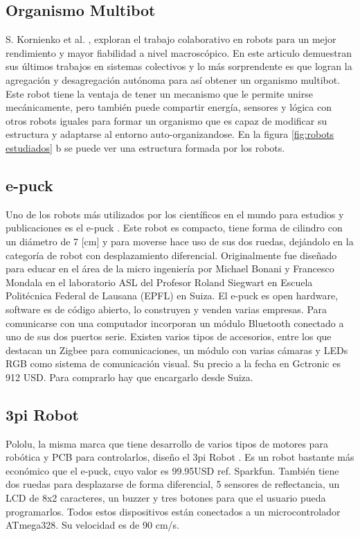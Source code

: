 \subsection{Organismo Multibot}
S. Kornienko et al. \cite{5359578}, exploran el trabajo colaborativo en robots para un mejor rendimiento y mayor fiabilidad a nivel macroscópico. En este articulo demuestran sus últimos trabajos en sistemas colectivos y lo más sorprendente es que logran la agregación y desagregación autónoma para así obtener un organismo multibot. Este robot tiene la ventaja de tener un mecanismo que le permite unirse mecánicamente, pero también puede compartir energía, sensores y lógica con otros robots iguales para formar un organismo que es capaz de modificar su estructura y adaptarse al entorno auto-organizandose. En la figura \ref{fig:robots estudiados} b se puede ver una estructura formada por los robots.

\subsection{e-puck}
Uno de los robots más utilizados por los científicos en el mundo para estudios y publicaciones es el e-puck \cite{mondada2009puck}. Este robot es compacto, tiene forma de cilindro con un diámetro de 7 [cm] y para moverse hace uso de sus dos ruedas, dejándolo en la categoría de robot con desplazamiento diferencial. Originalmente fue diseñado para educar en el área de la micro ingeniería por Michael Bonani y Francesco Mondala en el laboratorio ASL del Profesor Roland Siegwart en Escuela Politécnica Federal de Lausana (EPFL) en Suiza. El e-puck es open hardware, software es de código abierto,  lo construyen y venden varias empresas. Para comunicarse con una computador incorporan un módulo Bluetooth conectado a uno de sus dos puertos serie. Existen varios tipos de accesorios, entre los que destacan un Zigbee para comunicaciones, un módulo con varias cámaras y LEDs RGB como sistema de comunicación visual. Su precio a la fecha en Gctronic es 912 USD. Para comprarlo hay que encargarlo desde Suiza.

\subsection{3pi Robot}
Pololu, la misma marca que tiene desarrollo de varios tipos de motores para robótica y PCB para controlarlos, diseño el 3pi Robot \cite{thurskyusing}. Es un robot bastante más económico que el e-puck, cuyo valor es 99.95USD ref. Sparkfun. También tiene dos ruedas para desplazarse de forma diferencial, 5 sensores de reflectancia, un LCD de 8x2 caracteres, un buzzer y tres botones para que el usuario pueda programarlos. Todos estos dispositivos están conectados a un microcontrolador ATmega328. Su velocidad es de 90 cm/s.

